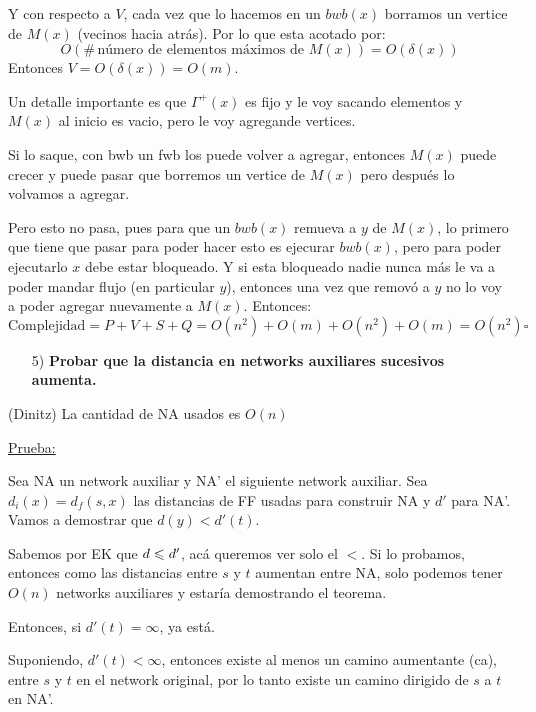 \documentclass[12pt,a4paper]{article}
\begin{document}
Y con respecto a $V$, cada vez que lo hacemos en un $bwb(x)$ borramos un 
vertice de $M(x)$ (vecinos hacia atrás). Por lo que esta acotado por:
$$O(\#\,\text{número de elementos máximos de $M(x)$}) = O(\delta(x))$$ 
Entonces $V = O(\delta(x)) = O(m)$.
\medskip

Un detalle importante es que $\Gamma^{+}(x)$ es fijo y le voy sacando elementos y 
$M(x)$ al inicio es vacio, pero le voy agregande vertices.
\medskip

Si lo saque, con bwb un fwb los puede volver a agregar, entonces $M(x)$ puede 
crecer y puede pasar que borremos un vertice de $M(x)$ pero después lo volvamos 
a agregar.
\medskip

Pero esto no pasa, pues para que un $bwb(x)$ remueva a $y$ de $M(x)$, lo primero 
que tiene que pasar para poder hacer esto es ejecurar $bwb(x)$, pero para 
poder ejecutarlo $x$ debe estar bloqueado. Y si esta bloqueado nadie nunca más 
le va a poder mandar flujo (en particular $y$), entonces una vez que removó a $y$ 
no lo voy a poder agregar nuevamente a $M(x)$. Entonces:
$$\text{Complejidad} = P + V + S + Q = O(n^{2}) + O(m) + O(n^{2}) + O(m) = O(n^{2}) \square$$

\begin{itemize}
    \item [5)] \textbf{Probar que la distancia en networks auxiliares sucesivos aumenta.}
    \label{dem:dist2}
\end{itemize}

\begin{teorema} (Dinitz) La cantidad de NA usados es $O(n)$
\end{teorema}
\underline{Prueba:}
\medskip

Sea NA un network auxiliar y NA' el siguiente network auxiliar. Sea $d_{i}(x) = d_{f}(s,x)$ 
las distancias de FF usadas para construir NA y $d'$ para NA'. Vamos a demostrar que 
$d(y) < d'(t)$.
\medskip

Sabemos por EK que $d \leqslant d'$, acá queremos ver solo el $<$. Si lo probamos, entonces 
como las distancias entre $s$ y $t$ aumentan entre NA, solo podemos tener $O(n)$ 
networks auxiliares y estaría demostrando el teorema.
\medskip

Entonces, si $d'(t) = \infty$, ya está.
\medskip

Suponiendo, $d'(t) < \infty$, entonces existe al menos un camino aumentante (ca), 
entre $s$ y $t$ en el network original, por lo tanto existe un camino dirigido de 
$s$ a $t$ en NA'.
\medskip
\end{document}
